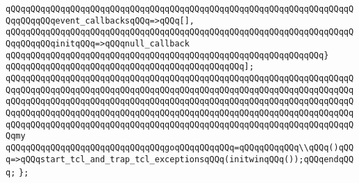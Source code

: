 \verb|qQQqqQQqqQQqqQQqqQQqqQQqqQQqqQQqqQQqqQQqqQQqqQQqqQQqqQQqqQQqqQQqqQQqqQQqqQQqqQQqevent_callbacksqQQq=>qQQq[],|\newline
\verb|qQQqqQQqqQQqqQQqqQQqqQQqqQQqqQQqqQQqqQQqqQQqqQQqqQQqqQQqqQQqqQQqqQQqqQQqqQQqqQQqinitqQQq=>qQQqnull_callback|\newline
\verb|qQQqqQQqqQQqqQQqqQQqqQQqqQQqqQQqqQQqqQQqqQQqqQQqqQQqqQQqqQQqqQQq}|\newline
\verb|qQQqqQQqqQQqqQQqqQQqqQQqqQQqqQQqqQQqqQQqqQQqqQQq];|\newline
\newline
\verb|qQQqqQQqqQQqqQQqqQQqqQQqqQQqqQQqqQQqqQQqqQQqqQQqqQQqqQQqqQQqqQQqqQQqqQQqqQQqqQQqqQQqqQQqqQQqqQQqqQQqqQQqqQQqqQQqqQQqqQQqqQQqqQQqqQQqqQQqqQQqqQQqqQQqqQQqqQQqqQQqqQQqqQQqqQQqqQQqqQQqqQQqqQQqqQQqqQQqqQQqqQQqqQQqqQQqqQQqqQQqqQQqqQQqqQQqqQQqqQQqqQQqqQQqqQQqqQQqqQQqqQQqqQQqqQQqqQQqqQQqqQQqqQQqqQQqqQQqqQQqqQQqqQQqqQQqqQQqqQQqqQQqqQQqqQQqqQQqqQQqqQQqqQQqqQQqmy|\newline
\verb|qQQqqQQqqQQqqQQqqQQqqQQqqQQqqQQqgoqQQqqQQqqQQq=qQQqqQQqqQQq\\qQQq()qQQq=>qQQqstart_tcl_and_trap_tcl_exceptionsqQQq(initwinqQQq());qQQqendqQQq;|\newline
\newline
\verb|};|\newline
\newline

